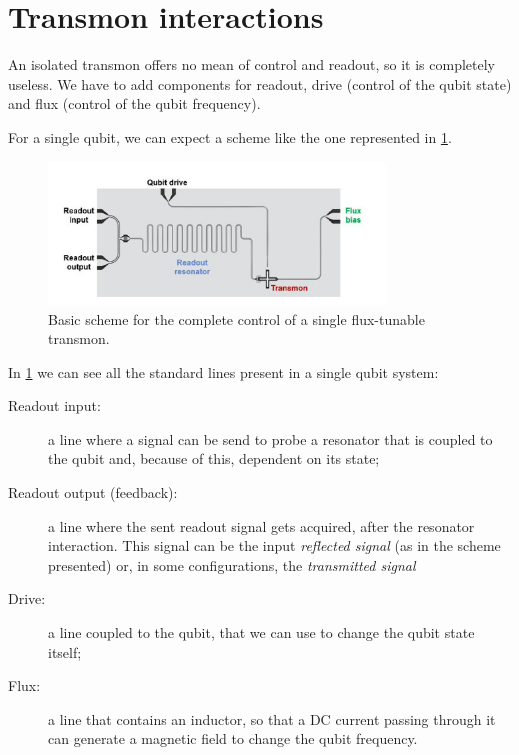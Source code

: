 
\section{Transmon interactions}

An isolated transmon offers no mean of control and readout, so it is completely useless.
We have to add components for readout, drive (control of the qubit state) and flux (control of the qubit frequency).

For a single qubit, we can expect a scheme like the one represented in \cref{fig:scheme-basic_interaction}.

\begin{figure}[ht]
    \centering
    \includegraphics[width=0.8\textwidth]{Theory/figures/scheme_basic_interactions.png}
    \caption{Basic scheme for the complete control of a single flux-tunable transmon.}
    \label{fig:scheme-basic_interaction}
\end{figure}

In \cref{fig:scheme-basic_interaction} we can see all the standard lines present in a single qubit system:

\begin{description}
    \item[Readout input:] a line where a signal can be send to probe a resonator that is coupled to the qubit and, because of this, dependent on its state;
    \item[Readout output (feedback):] a line where the sent readout signal gets acquired, after the resonator interaction. This signal can be the input {\it reflected signal} (as in the scheme presented) or, in some configurations, the {\it transmitted signal}
    \item[Drive:] a line coupled to the qubit, that we can use to change the qubit state itself;
    \item[Flux:] a line that contains an inductor, so that a DC current passing through it can generate a magnetic field to change the qubit frequency.
\end{description}


